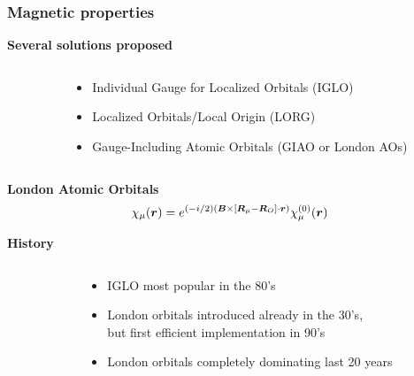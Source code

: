 \begin{frame}
    \frametitle{Magnetic properties}
    \centering
    \textbf{Several solutions proposed}

    \begin{columns}
    \begin{column}[b]{0.1\linewidth}
    \end{column}
    \begin{column}[b]{0.9\linewidth}
    \begin{itemize}
        \item   Individual Gauge for Localized Orbitals (IGLO)
        \item   Localized Orbitals/Local Origin (LORG)
        \item   Gauge-Including Atomic Orbitals (GIAO or London AOs)
    \end{itemize}
    \end{column}
    \end{columns}

    \vspace{5mm}

    \textbf{London Atomic Orbitals}
    \begin{equation}
        \nonumber
        \chi_\mu(\boldsymbol r) =
        e^{(-i/2)(\boldsymbol B\times[\boldsymbol R_\mu-\boldsymbol R_O]\cdot\boldsymbol r)}\chi_\mu^{(0)}(\boldsymbol r)
    \end{equation}

    \vspace{5mm}

    \textbf{History}
    \begin{columns}
    \begin{column}[b]{0.1\linewidth}
    \end{column}
    \begin{column}[b]{0.9\linewidth}
    \begin{itemize}
        \item   IGLO most popular in the 80's
        \item   London orbitals introduced already in the 30's,\\
                but first efficient implementation in 90's
        \item   London orbitals completely dominating last 20 years
    \end{itemize}
    \end{column}
    \end{columns}
\end{frame}
